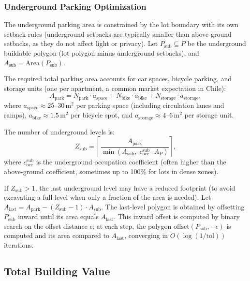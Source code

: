 \documentclass[11pt,a4paper]{article}
\begin{document}
\subsubsection{Underground Parking Optimization}

The underground parking area is constrained by the lot boundary with
its own setback rules (underground setbacks are typically smaller than
above-ground setbacks, as they do not affect light or privacy). Let
$P_{\text{sub}} \subseteq P$ be the underground buildable polygon (lot
polygon minus underground setbacks), and
$A_{\text{sub}} = \text{Area}(P_{\text{sub}})$.

The required total parking area accounts for car spaces, bicycle parking,
and storage units (one per apartment, a common market expectation in
Chile):
\begin{equation}
    A_{\text{park}} = N_{\text{park}} \cdot a_{\text{space}} + N_{\text{bike}} \cdot a_{\text{bike}} + N_{\text{storage}} \cdot a_{\text{storage}},
\end{equation}
where $a_{\text{space}} \approx 25$--$30$\,m$^2$ per parking space
(including circulation lanes and ramps), $a_{\text{bike}} \approx
1.5$\,m$^2$ per bicycle spot, and $a_{\text{storage}} \approx
4$--$6$\,m$^2$ per storage unit.

The number of underground levels is:
\begin{equation}
    Z_{\text{sub}} = \left\lceil \frac{A_{\text{park}}}{\min(A_{\text{sub}},\; c_{\text{occ}}^{\text{sub}} \cdot A_P)} \right\rceil,
\end{equation}
where $c_{\text{occ}}^{\text{sub}}$ is the underground occupation
coefficient (often higher than the above-ground coefficient, sometimes
up to 100\% for lots in dense zones).

If $Z_{\text{sub}} > 1$, the last underground level may have a reduced
footprint (to avoid excavating a full level when only a fraction of the
area is needed). Let $A_{\text{last}} = A_{\text{park}} - (Z_{\text{sub}}
- 1) \cdot A_{\text{sub}}$. The last-level polygon is obtained by
offsetting $P_{\text{sub}}$ inward until its area equals
$A_{\text{last}}$. This inward offset is computed by binary search on
the offset distance $\epsilon$: at each step, the polygon
$\text{offset}(P_{\text{sub}}, -\epsilon)$ is computed and its area
compared to $A_{\text{last}}$, converging in $O(\log(1/\text{tol}))$
iterations.

\subsection{Total Building Value}
\end{document}
